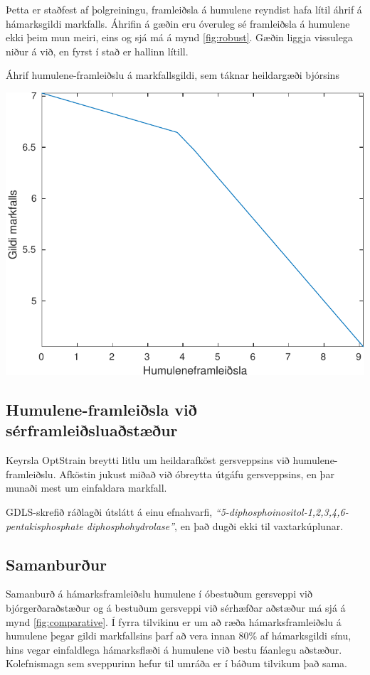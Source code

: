 \documentclass[11pt]{article}
\makeatletter
\newenvironment{figureonecolumn}{\begin{minipage}{\linewidth}\begin{center}\def\@captype{figure}}{\end{center}\end{minipage}}
\makeatother
\begin{document}
\begin{multicols}{2}
Þetta er staðfest af þolgreiningu, framleiðsla á humulene reyndist hafa lítil áhrif á hámarksgildi markfalls. Áhrifin á gæðin eru óveruleg sé framleiðsla á humulene ekki þeim mun meiri, eins og sjá má á mynd \ref{fig:robust}. Gæðin liggja vissulega niður á við, en fyrst í stað er hallinn lítill.

\begin{figureonecolumn}
\caption{Áhrif humulene-framleiðslu á markfallsgildi, sem táknar heildargæði bjórsins}
\label{fig:robust}
\includegraphics[width=\linewidth]{Pics/BrewingRobustnessAnalysis}
\end{figureonecolumn}
\subsection{Humulene-framleiðsla við sérframleiðsluaðstæður}
Keyrsla OptStrain breytti litlu um heildarafköst gersveppsins við humulene-framleiðslu. Afköstin jukust miðað við óbreytta útgáfu gersveppsins, en þar munaði mest um einfaldara markfall.

GDLS-skrefið ráðlagði útslátt á einu efnahvarfi, \emph{``5-diphosphoinositol-1,2,3,4,6-pentakisphosphate diphosphohydrolase''}, en það dugði ekki til vaxtarkúplunar.
\subsection{Samanburður}
Samanburð á hámarksframleiðslu humulene í óbestuðum gersveppi við bjórgerðaraðstæður og á bestuðum gersveppi við sérhæfðar aðstæður má sjá á mynd \ref{fig:comparative}. Í fyrra tilvikinu er um að ræða hámarksframleiðslu á humulene þegar gildi markfallsins þarf að vera innan 80\% af hámarksgildi sínu, hins vegar einfaldlega hámarksflæði á humulene við bestu fáanlegu aðstæður. Kolefnismagn sem sveppurinn hefur til umráða er í báðum tilvikum það sama.


\end{multicols}
\end{document}
